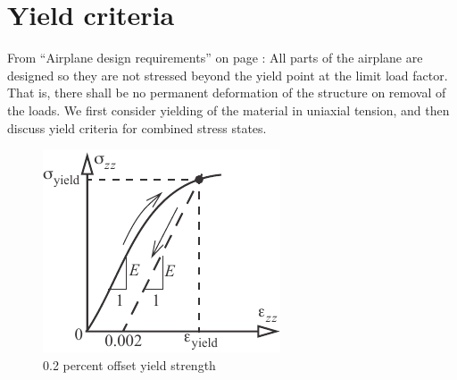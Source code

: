 \documentclass{AeroStructure-ERJohnson}
\begin{document}
\section{Yield criteria}\label{sec4.2}

From ``Airplane design requirements'' on page \pageref{sec2.4.1}: All parts of the airplane are designed so they are not stressed beyond the yield point at the limit load factor. That is, there shall be no permanent deformation of the structure on removal of the loads. We first consider yielding of the material in uniaxial tension, and then discuss yield criteria for combined stress states.

\begin{figure}
\vspace{-19pt}
\includegraphics{Figure_4-3.pdf}
\caption{0.2 percent offset yield strength\label{fig4.3}}
\end{figure}
\end{document}
